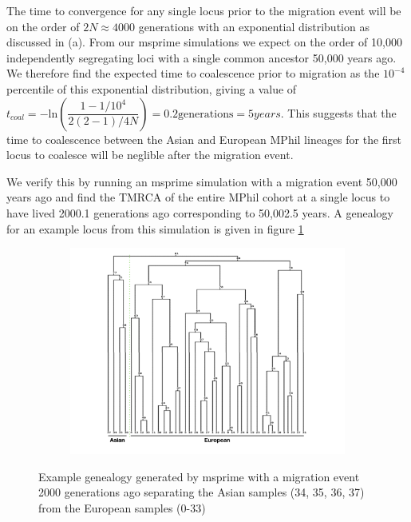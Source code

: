 \documentclass{article}
\begin{document}
The time to convergence for any single locus prior to the migration event will be on the order of $2N \approx 4000$ generations with an exponential distribution as discussed in (a). From our msprime simulations we expect on the order of  10,000 independently segregating loci with a single common ancestor 50,000 years ago. We therefore find the expected time to coalescence prior to migration as the $10^{-4}$ percentile of this exponential distribution, giving a value of $t_{coal} = - \text{ln}(\dfrac{1-1/10^{4}}{2(2-1)/4N}) = 0.2 \text{generations} = 5 years$. This suggests that the time to coalescence between the Asian and European MPhil lineages for the first locus to coalesce will be neglible after the migration event.

We verify this by running an msprime simulation with a migration event 50,000 years ago and find the TMRCA of the entire MPhil cohort at a single locus to have lived 2000.1 generations ago corresponding to 50,002.5 years.
A genealogy for an example locus from this simulation is given in figure \ref{fig:structure}

\begin{figure}[h]
	\centering
	\begin{subfigure}[t]{0.85\linewidth}
		\centering
		\includegraphics[width = 1.0\linewidth, trim={0 0 0 0}, clip=true]{figures/example_tree_msprime.png}
	\end{subfigure}
\caption{Example genealogy generated by msprime with a migration event 2000 generations ago separating the Asian samples (34, 35, 36, 37) from the European samples (0-33)}
\label{fig:structure}
\end{figure}
\end{document}
